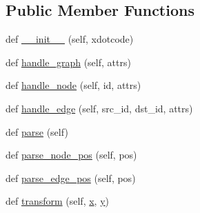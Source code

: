 \subsection*{Public Member Functions}
\begin{DoxyCompactItemize}
\item 
def \hyperlink{classsmacc__viewer_1_1xdot_1_1xdot__qt_1_1XDotParser_a71d3a5d20bb398c20171dd10810ed7c8}{\+\_\+\+\_\+init\+\_\+\+\_\+} (self, xdotcode)
\item 
def \hyperlink{classsmacc__viewer_1_1xdot_1_1xdot__qt_1_1XDotParser_a4082ecea1c9ed3b4ea1b389f2fb489fe}{handle\+\_\+graph} (self, attrs)
\item 
def \hyperlink{classsmacc__viewer_1_1xdot_1_1xdot__qt_1_1XDotParser_a90d5ff7a7cb6de0bc34685114ca2340a}{handle\+\_\+node} (self, id, attrs)
\item 
def \hyperlink{classsmacc__viewer_1_1xdot_1_1xdot__qt_1_1XDotParser_a941fa1a5ed35126c903e44d2a5b97367}{handle\+\_\+edge} (self, src\+\_\+id, dst\+\_\+id, attrs)
\item 
def \hyperlink{classsmacc__viewer_1_1xdot_1_1xdot__qt_1_1XDotParser_add61c2f7fdc61082552fceb44e4bd88c}{parse} (self)
\item 
def \hyperlink{classsmacc__viewer_1_1xdot_1_1xdot__qt_1_1XDotParser_aa5cb738f4fd0fce23b59263fcfe82208}{parse\+\_\+node\+\_\+pos} (self, pos)
\item 
def \hyperlink{classsmacc__viewer_1_1xdot_1_1xdot__qt_1_1XDotParser_acd1d89d13fa8fdd48d7d23c8b72dd2f9}{parse\+\_\+edge\+\_\+pos} (self, pos)
\item 
def \hyperlink{classsmacc__viewer_1_1xdot_1_1xdot__qt_1_1XDotParser_ab136f7aaca27f3d01f24c816a276b929}{transform} (self, \hyperlink{namespacesmacc__viewer_1_1xdot_1_1xdot__qt_a1dd3d4e1f636ed9ebbed9b32d4c196df}{x}, \hyperlink{namespacesmacc__viewer_1_1xdot_1_1xdot__qt_a784c76c541d5dd5940e217a1aa54f256}{y})
\end{DoxyCompactItemize}
